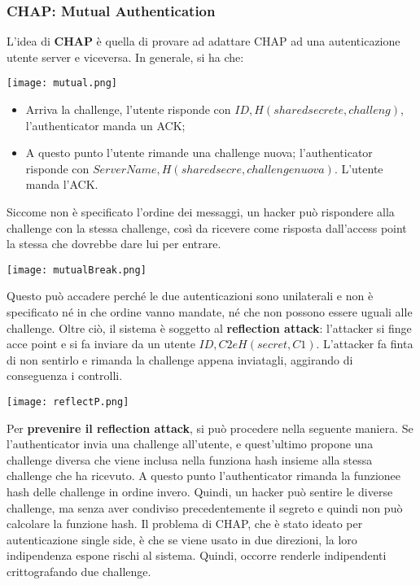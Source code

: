 \documentclass{article}
\theoremstyle{remark}
\begin{document}
\subsubsection{CHAP: Mutual Authentication}
L'idea di \textbf{CHAP} è quella di provare ad adattare CHAP ad una autenticazione utente server e viceversa. In generale, si ha che:
\begin{center}
    \texttt{[image: mutual.png]}
\end{center}
\begin{itemize}
    \item Arriva la challenge, l'utente risponde con $ID,H(sharedsecrete, challeng)$, l'authenticator manda un ACK;
    \item A questo punto l'utente rimande una challenge nuova; l'authenticator risponde con $ServerName,H(sharedsecre,challenge nuova)$. L'utente manda l'ACK.
\end{itemize}
Siccome non è specificato l'ordine dei messaggi, un hacker può rispondere alla challenge con la stessa challenge, così da ricevere come risposta dall'access point la stessa che dovrebbe dare lui per entrare.\newline
\begin{center}
    \texttt{[image: mutualBreak.png]}
\end{center}
Questo può accadere perché le due autenticazioni sono unilaterali e non è specificato né in che ordine vanno mandate, né che non possono essere uguali alle challenge. Oltre ciò, il sistema è soggetto al \textbf{reflection attack}: l'attacker si finge acce point e si fa inviare da un utente $ID,C2 e H(secret,C1)$. L'attacker fa finta di non sentirlo e rimanda la challenge appena inviatagli, aggirando di conseguenza i controlli.
\begin{center}
    \texttt{[image: reflectP.png]}
\end{center}
Per \textbf{prevenire il reflection attack}, si può procedere nella seguente maniera. Se l'authenticator invia una challenge all'utente, e quest'ultimo propone una challenge diversa che viene inclusa nella funziona hash insieme alla stessa challenge che ha ricevuto. A questo punto l'authenticator rimanda la funzionee hash delle challenge in ordine invero. Quindi, un hacker può sentire le diverse challenge, ma senza aver condiviso precedentemente il segreto e quindi non può calcolare la funzione hash.
Il problema di CHAP, che è stato ideato per autenticazione single side, è che se viene usato in due direzioni, la loro indipendenza espone rischi al sistema. Quindi, occorre renderle indipendenti crittografando due challenge.
\end{document}
